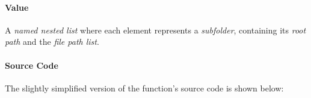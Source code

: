\documentclass[
]{report}
\begin{document}
\protect{}\label{func.img.file.get_list.value}
\paragraph{Value}\label{value-1}

\hfill\break

A \emph{named nested list} where each element represents a \emph{subfolder}, containing its \emph{root path} and the \emph{file path list}.

\protect{}\label{func.img.file.get_list.code}
\paragraph{Source Code}\label{source-code-2}

\hfill\break

The slightly simplified version of the function's source code is shown below:
\end{document}
